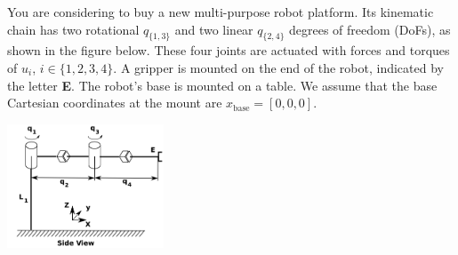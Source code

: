 You are considering to buy a new multi-purpose robot platform. Its kinematic chain has two rotational $q_{\{1,3\}}$ and two linear $q_{\{2,4\}}$ degrees of freedom (DoFs), as shown in the figure below. These four joints are actuated with forces and torques of $u_i$, $i\in\{1,2,3,4\}$. A gripper is mounted on the end of the robot, indicated by the letter \textbf{E}. The robot's base is mounted on a table. We assume that the base Cartesian coordinates at the mount are $x_\textrm{base}=[0,0,0]$.  

\begin{center}
   \includegraphics[width=0.35\textwidth]{img/robot.png} 
\end{center}



